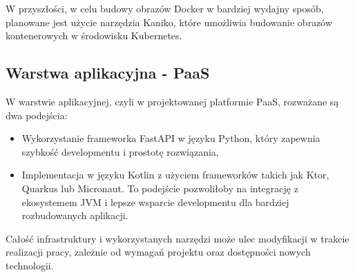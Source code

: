 W przyszłości, w celu budowy obrazów Docker w bardziej wydajny sposób, planowane jest użycie narzędzia Kaniko, które umożliwia budowanie obrazów kontenerowych w środowisku Kubernetes.

\subsection{Warstwa aplikacyjna - PaaS}

W warstwie aplikacyjnej, czyli w projektowanej platformie PaaS, rozważane są dwa podejścia:

\begin{itemize}
    \item Wykorzystanie frameworka FastAPI w języku Python, który zapewnia szybkość developmentu i prostotę rozwiązania,
    \item Implementacja w języku Kotlin z użyciem frameworków takich jak Ktor, Quarkus lub Micronaut. To podejście pozwoliłoby na integrację z ekosystemem JVM i lepsze wsparcie developmentu dla bardziej rozbudowanych aplikacji.
\end{itemize}

Całość infrastruktury i wykorzystanych narzędzi może ulec modyfikacji w trakcie realizacji pracy, zależnie od wymagań projektu oraz dostępności nowych technologii.